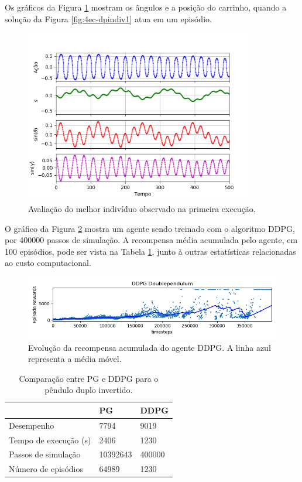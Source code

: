 Os gráficos da Figura \ref{fig:4ec-dpvargraf} mostram os ângulos e a posição do carrinho, quando a solução da Figura \ref{fig:4ec-dpindiv1} atua em um episódio.

\begin{figure}[H]
	\centering
	\includegraphics[width=0.9\textwidth]{02_desenvolvimento/04_EC_Fig_DPVarGraf}
	\caption{Avaliação do melhor indivíduo observado na primeira execução.}
	\label{fig:4ec-dpvargraf}
\end{figure}

O gráfico da Figura \ref{fig:4ec-dpddpgtrain} mostra um agente sendo treinado com o algoritmo DDPG, por 400000 passos de simulação. A recompensa média acumulada pelo agente, em 100 episódios, pode ser vista na Tabela \ref{tab:4ec-dpcomp}, junto à outras estatísticas relacionadas ao custo computacional.

\begin{figure}[H]
	\centering
	\includegraphics[width=\textwidth]{02_desenvolvimento/04_EC_Fig_DPDDPGTrain}
	\caption{Evolução da recompensa acumulada do agente DDPG. A linha azul representa a média móvel.}
	\label{fig:4ec-dpddpgtrain}
\end{figure}

\begin{table}[H]
	\centering
	\begin{tabular}{l|l|l} \toprule
		{} & {{PG}} & {{DDPG}} \\ \midrule
		{{Desempenho}} & {7794} & {9019} \\
		{{Tempo de execução (s)}} & {2406} & {1230} \\
		{{Passos de simulação}} & {10392643} & {400000} \\
		{{Número de episódios}} & {64989} & {1230} \\
		\bottomrule
	\end{tabular}
	\caption{Comparação entre PG e DDPG para o pêndulo duplo invertido.}\label{tab:4ec-dpcomp}
\end{table}

